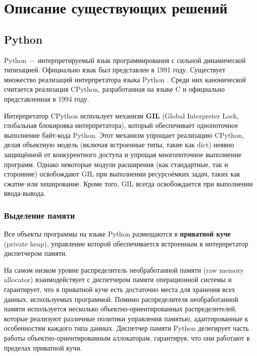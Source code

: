 \chapter{Описание существующих решений}

\section{Python}

Python \cite{python} --- интерпретируемый язык программирования с сильной динамической типизацией. Официально язык был представлен в 1991 году. Существует множество реализаций интерпретатора языка Python \cite{juthon} \cite{ironpython} \cite{pypy}. Среди них канонической считается реализация CPython, разработанная на языке C и официально представленная в 1994 году. \cite{cpython}

Интерпретатор CPython использует механизм \textbf{GIL} (Global Interpreter Lock, глобальная блокировка интерпретатора), который обеспечивает однопоточное выполнение байт-кода Python. Этот механизм упрощает реализацию CPython, делая объектную модель (включая встроенные типы, такие как dict) неявно защищённой от конкурентного доступа и упрощая многопоточное выполнение программ. Однако некоторые модули расширения (как стандартные, так и сторонние) \cite{python_extensions} освобождают GIL при выполнении ресурсоёмких задач, таких как сжатие или хеширование. Кроме того, GIL всегда освобождается при выполнении ввода-вывода. \cite{gil}

\subsection{Выделение памяти}

Все объекты программы на языке Python размещаются в \textbf{приватной куче} (private heap), управление которой обеспечивается встроенным в интерпретатор диспетчером памяти. \cite{python_memory}

На самом низком уровне распределитель необработанной памяти (raw memory allocator) взаимодействует с диспетчером памяти операционной системы и гарантирует, что в приватной куче есть достаточно места для хранения всех данных, используемых программой. Помимо распределителя необработанной памяти используется несколько объектно-ориентированных распределителей, которые реализуют различные политики управления памятью, адаптированные к особенностям каждого типа данных. Диспетчер памяти Python делегирует часть работы объектно-ориентированным аллокаторам, гарантируя, что они работают в пределах приватной кучи. \cite{python_memory}


